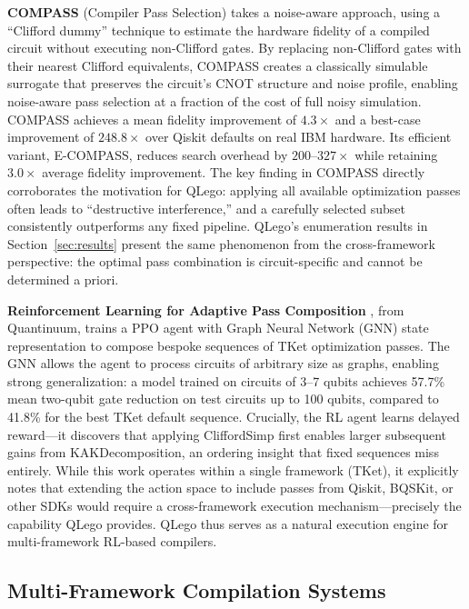 \documentclass[conference]{IEEEtran}
\begin{document}
\textbf{COMPASS} (Compiler Pass Selection) \cite{dangwal2024compass} takes a noise-aware approach, using a ``Clifford dummy'' technique to estimate the hardware fidelity of a compiled circuit without executing non-Clifford gates. By replacing non-Clifford gates with their nearest Clifford equivalents, COMPASS creates a classically simulable surrogate that preserves the circuit's CNOT structure and noise profile, enabling noise-aware pass selection at a fraction of the cost of full noisy simulation. COMPASS achieves a mean fidelity improvement of $4.3\times$ and a best-case improvement of $248.8\times$ over Qiskit defaults on real IBM hardware. Its efficient variant, E-COMPASS, reduces search overhead by $200$--$327\times$ while retaining $3.0\times$ average fidelity improvement. The key finding in COMPASS directly corroborates the motivation for QLego: applying all available optimization passes often leads to ``destructive interference,'' and a carefully selected subset consistently outperforms any fixed pipeline. QLego's enumeration results in Section~\ref{sec:results} present the same phenomenon from the cross-framework perspective: the optimal pass combination is circuit-specific and cannot be determined a priori.

\textbf{Reinforcement Learning for Adaptive Pass Composition} \cite{mills2026rl}, from Quantinuum, trains a PPO agent with Graph Neural Network (GNN) state representation to compose bespoke sequences of TKet optimization passes. The GNN allows the agent to process circuits of arbitrary size as graphs, enabling strong generalization: a model trained on circuits of 3--7 qubits achieves 57.7\% mean two-qubit gate reduction on test circuits up to 100 qubits, compared to 41.8\% for the best TKet default sequence. Crucially, the RL agent learns delayed reward—it discovers that applying CliffordSimp first enables larger subsequent gains from KAKDecomposition, an ordering insight that fixed sequences miss entirely. While this work operates within a single framework (TKet), it explicitly notes that extending the action space to include passes from Qiskit, BQSKit, or other SDKs would require a cross-framework execution mechanism—precisely the capability QLego provides. QLego thus serves as a natural execution engine for multi-framework RL-based compilers.

\subsection{Multi-Framework Compilation Systems}
\end{document}

